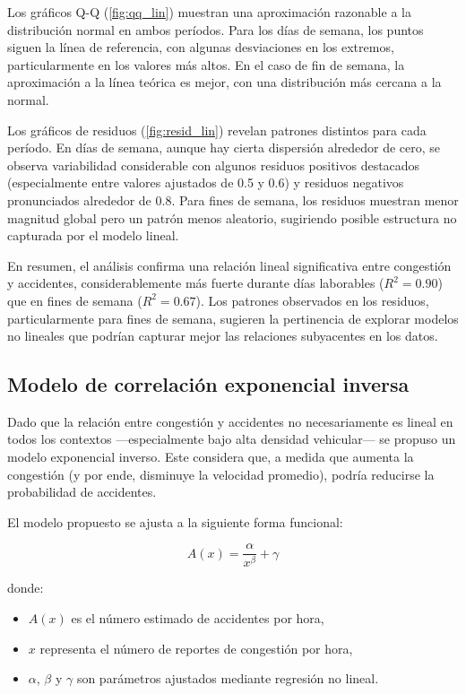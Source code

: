 \documentclass[12pt]{article}
\begin{document}
Los gráficos Q-Q (\cref{fig:qq_lin}) muestran una aproximación razonable a la distribución normal en ambos períodos. Para los días de semana, los puntos siguen la línea de referencia, con algunas desviaciones en los extremos, particularmente en los valores más altos. En el caso de fin de semana, la aproximación a la línea teórica es mejor, con una distribución más cercana a la normal.

Los gráficos de residuos (\cref{fig:resid_lin}) revelan patrones distintos para cada período. En días de semana, aunque hay cierta dispersión alrededor de cero, se observa variabilidad considerable con algunos residuos positivos destacados (especialmente entre valores ajustados de 0.5 y 0.6) y residuos negativos pronunciados alrededor de 0.8. Para fines de semana, los residuos muestran menor magnitud global pero un patrón menos aleatorio, sugiriendo posible estructura no capturada por el modelo lineal.

En resumen, el análisis confirma una relación lineal significativa entre congestión y accidentes, considerablemente más fuerte durante días laborables ($R^2 = 0.90$) que en fines de semana ($R^2 = 0.67$). Los patrones observados en los residuos, particularmente para fines de semana, sugieren la pertinencia de explorar modelos no lineales que podrían capturar mejor las relaciones subyacentes en los datos.


\subsection{Modelo de correlación exponencial inversa}

Dado que la relación entre congestión y accidentes no necesariamente es lineal en todos los contextos —especialmente bajo alta densidad vehicular— se propuso un modelo exponencial inverso. Este considera que, a medida que aumenta la congestión (y por ende, disminuye la velocidad promedio), podría reducirse la probabilidad de accidentes.

El modelo propuesto se ajusta a la siguiente forma funcional:

\begin{equation}
A(x) = \frac{\alpha}{x^{\beta}} + \gamma
\end{equation}

donde:
\begin{itemize}
    \item $A(x)$ es el número estimado de accidentes por hora,
    \item $x$ representa el número de reportes de congestión por hora,
    \item $\alpha$, $\beta$ y $\gamma$ son parámetros ajustados mediante regresión no lineal.
\end{itemize}
\end{document}
